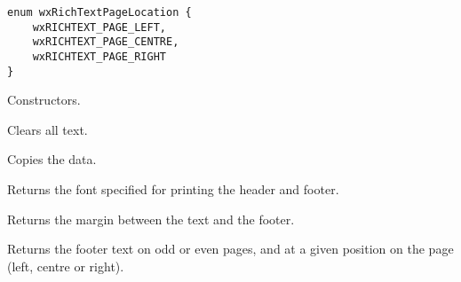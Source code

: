 \begin{verbatim}
enum wxRichTextPageLocation {
    wxRICHTEXT_PAGE_LEFT,
    wxRICHTEXT_PAGE_CENTRE,
    wxRICHTEXT_PAGE_RIGHT
}
\end{verbatim}


\label{wxrichtextheaderfooterdatawxrichtextheaderfooterdata}



Constructors.

\label{wxrichtextheaderfooterdataclear}


Clears all text.

\label{wxrichtextheaderfooterdatacopy}


Copies the data.

\label{wxrichtextheaderfooterdatagetfont}


Returns the font specified for printing the header and footer.

\label{wxrichtextheaderfooterdatagetfootermargin}


Returns the margin between the text and the footer.

\label{wxrichtextheaderfooterdatagetfootertext}


Returns the footer text on odd or even pages, and at a given position on the page (left, centre or right).

\label{wxrichtextheaderfooterdatagetheadermargin}


